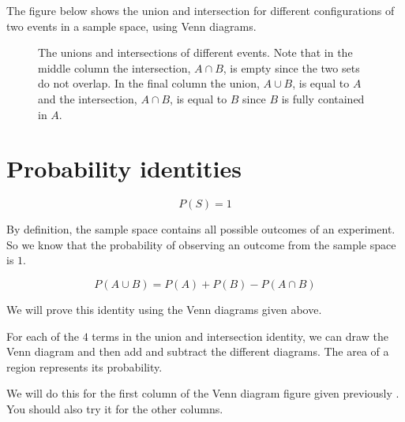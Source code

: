 
The figure below shows the union and intersection for different
configurations of two events in a sample space, using Venn diagrams.

\begin{figure}[H]
  
  \begin{caption*}{The unions and intersections of different events. Note that
    in the middle column the intersection, $A \cap B$, is empty since
    the two sets do not overlap. In the final column the union,
    $A \cup B$, is equal to $A$ and the intersection, $A \cap B$, is
    equal to $B$ since $B$ is fully contained in $A$.}\end{caption*}
  \label{fig:venn_union_intersection}
\end{figure}
\par
{}
\section{Probability identities}
\begin{equation*}
 P(S)=1
\end{equation*}


By definition, the sample space contains all possible outcomes of an
experiment. So we know that the probability of observing an outcome
from the sample space is $1$.

\begin{equation*}
 P(A \cup B) = P(A) + P(B) - P(A \cap B)
\end{equation*}


We will prove this identity using the Venn diagrams given above.

For each of the $4$ terms in the
union and intersection identity, we can draw the Venn diagram and then
add and subtract the different diagrams. The area of a region
represents its probability.

We will do this for the first column of the Venn diagram figure given previously%
. You should also try it for the
other columns.

